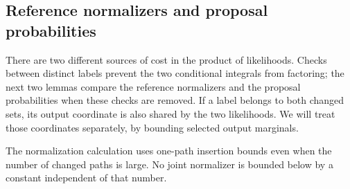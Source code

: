 \subsection{Reference normalizers and proposal probabilities}

There are two different sources of cost in the product of likelihoods.
Checks between distinct labels prevent the two conditional integrals from
factoring; the next two lemmas compare the reference normalizers and the
proposal probabilities when these checks are removed.  If a label belongs
to both changed sets, its output coordinate is also shared by the two
likelihoods.  We will treat those coordinates separately, by bounding
selected output marginals.

The normalization calculation uses one-path insertion bounds even when
the number of changed paths is large.  No joint normalizer is bounded
below by a constant independent of that number.

